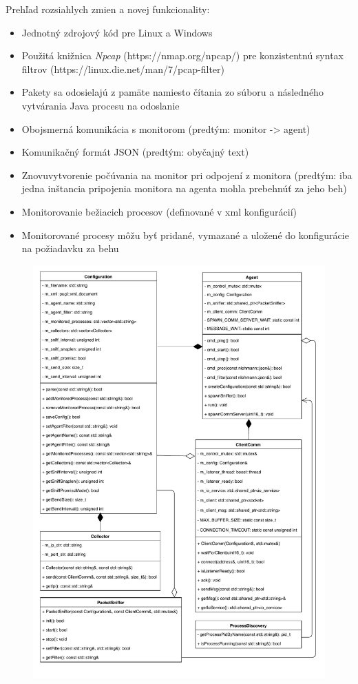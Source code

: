 \documentclass[a4paper,12pt]{article}
\begin{document}
\noindent Prehľad rozsiahlych zmien a novej funkcionality:
\begin{itemize} 
	\item Jednotný zdrojový kód pre Linux a Windows
	\item Použitá knižnica \textit{Npcap} (https://nmap.org/npcap/) pre konzistentnú syntax filtrov (https://linux.die.net/man/7/pcap-filter)
	\item Pakety sa odosielajú z pamäte namiesto čítania zo súboru a následného vytvárania Java procesu na odoslanie 
	\item Obojsmerná komunikácia s monitorom (predtým: monitor -> agent)
	\item Komunikačný formát JSON (predtým: obyčajný text)
	\item Znovuvytvorenie počúvania na monitor pri odpojení z monitora (predtým: iba jedna inštancia pripojenia monitora na agenta mohla prebehnúť za jeho beh)
	\item Monitorovanie bežiacich procesov (definované v xml konfigurácií) 
	\item Monitorované procesy môžu byť pridané, vymazané a uložené do konfigurácie na požiadavku za behu \\
\end{itemize}

\begin{figure}[h!]
	\centering
	\label{graf1}
	\includegraphics[scale=0.85]{agent.pdf}
\end{figure}
\end{document}
